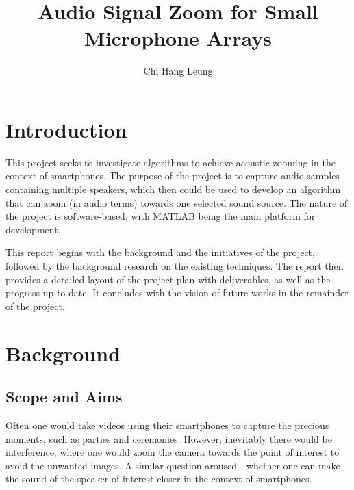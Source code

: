 \documentclass[a4paper,twoside,12pt,hidelinks]{article}
\title{Audio Signal Zoom for Small Microphone Arrays}
\author{Chi Hang Leung}
\begin{document}

\pagebreak
\clearpage
\setcounter{page}{1}
\onehalfspacing
\setcounter{tocdepth}{2}
\tableofcontents
{}
\newpage
\section{Introduction}
This project seeks to investigate algorithms to achieve acoustic zooming in the context of smartphones. The purpose of the project is to capture audio samples containing multiple speakers, which then could be used to develop an algorithm that can zoom (in audio terms) towards one selected sound source. The nature of the project is software-based, with MATLAB being the main platform for development.

This report begins with the background and the initiatives of the project, followed by the background research on the existing techniques. The report then provides a detailed layout of the project plan with deliverables, as well as the progress up to date. It concludes with the vision of future works in the remainder of the project.
\section{Background}
\subsection{Scope and Aims}
Often one would take videos using their smartphones to capture the precious moments, such as parties and ceremonies. However, inevitably there would be interference, where one would zoom the camera towards the point of interest to avoid the unwanted images. A similar question aroused - whether one can make the sound of the speaker of interest closer in the context of smartphones.
\end{document}
